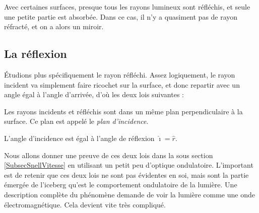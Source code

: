 Avec certaines surfaces, presque tous les rayons lumineux sont réfléchis, et seule une petite partie est absorbée. Dans ce cas, il n'y a quasiment pas de rayon réfracté, et on a alors un miroir.

\subsection{La réflexion}

Étudions plus spécifiquement le rayon réfléchi. Assez logiquement, le rayon incident va simplement \og faire ricochet\fg{} sur la surface, et donc repartir avec un angle égal à l'angle d'arrivée, d'où les deux lois suivantes :

\begin{loiphyz}
Les rayons incidents et réfléchis sont dans un même plan perpendiculaire à la surface. Ce plan est appelé le \emph{plan d'incidence}.
\end{loiphyz}

\begin{loiphyz}
L'angle d'incidence est égal à l'angle de réflexion $\hat \imath=\hat r$.
\end{loiphyz}

Nous allons donner une preuve de ces deux lois dans la sous section \ref{SubsecSnellVitesse} en utilisant un petit peu d'optique ondulatoire. L'important est de retenir que ces deux lois ne sont pas \og évidentes\fg{} en soi, mais sont la partie émergée de l'iceberg qu'est le comportement ondulatoire de la lumière. Une description complète du phénomène demande de voir la lumière comme une onde électromagnétique. Cela devient vite très compliqué.


\newcommand{\prefigreflexion}[1]{%

\pstGeonode(0,0){O}(2,0){P}
\pstRotation[RotAngle=90]{O}{P}[Qi]
\pstHomO[HomCoef=0.5]{O}{Qi}[Q]
\pstRotation[RotAngle=180]{O}{P}[R]
\pstHomO[HomCoef=-1]{O}{Q}[S]
\pstRotation[RotAngle=-#1]{O}{R}[Ri]		%
    \pstDioptre{O}{P}{Ri}{0.9}{2}{Rs}{Re}	%
}

\newcommand{\tracefigreflexion}{%

   \pstMarkAngle{Q}{O}{Ri}{$\hat\imath$}
   \pstMarkAngle{Rs}{O}{Q}{$\hat r$}

   \psline(R)(P)
   \psline[linecolor=lightgray](O)(Q)
   \psline[linecolor=lightgray](O)(S)

   \pstRayon{Ri}{O}
   \pstRayon{O}{Rs}
}

